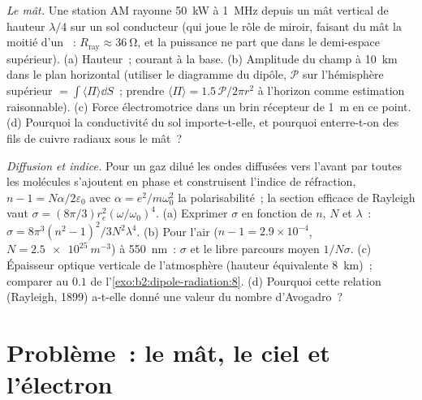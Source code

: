 \begin{exercise}[$\star\star\star$]\label{exo:b2:dipole-radiation:11}
\emph{Le mât.} Une station AM rayonne \qty{50}{kW} à \qty{1}{MHz} depuis un
mât vertical de hauteur $\lambda/4$ sur un sol conducteur (qui joue le rôle
de miroir, faisant du mât la moitié d'un ~: $R_{\text{ray}} \approx
\qty{36}{\ohm}$, et la puissance ne part que dans le demi-espace supérieur). (a)
Hauteur~; courant à la base. (b) Amplitude du champ à \qty{10}{km} dans le
plan horizontal (utiliser le diagramme du dipôle, $\mathcal P$ sur l'hémisphère
supérieur $= \int\langle\Pi\rangle\dd S$~; prendre $\langle\Pi\rangle = 1.5\,
\mathcal P/2\pi r^2$ à l'horizon comme estimation raisonnable). (c) Force électromotrice dans un
brin récepteur de \qty{1}{m} en ce point. (d) Pourquoi la conductivité du sol
importe-t-elle, et pourquoi enterre-t-on des fils de cuivre radiaux sous le mât~?
\end{exercise}

\begin{exercise}[$\star\star\star$]\label{exo:b2:dipole-radiation:12}
\emph{Diffusion et indice.} Pour un gaz dilué les ondes diffusées vers l'avant
par toutes les molécules s'ajoutent en phase et construisent l'indice de réfraction,
$n - 1 = N\alpha/2\varepsilon_0$ avec $\alpha = e^2/m\omega_0^2$ la polarisabilité~; la
section efficace de Rayleigh vaut $\sigma = (8\pi/3)r_e^2(\omega/\omega_0)^4$. (a) Exprimer
$\sigma$ en fonction de $n$, $N$ et $\lambda$~: $\sigma = 8\pi^3(n^2 - 1)^2/3N^2\lambda^4$. (b)
Pour l'air ($n - 1 = 2.9 \times 10^{-4}$, $N = \qty{2.5e25}{m^{-3}}$) à \qty{550}{nm}~:
$\sigma$ et le libre parcours moyen $1/N\sigma$. (c) Épaisseur optique verticale de
l'atmosphère (hauteur équivalente \qty{8}{km})~; comparer au $0.1$ de
l'\cref{exo:b2:dipole-radiation:8}. (d) Pourquoi cette relation (Rayleigh,
1899) a-t-elle donné une valeur du nombre d'Avogadro~?
\end{exercise}

\section{Problème~: le mât, le ciel et l'électron}

